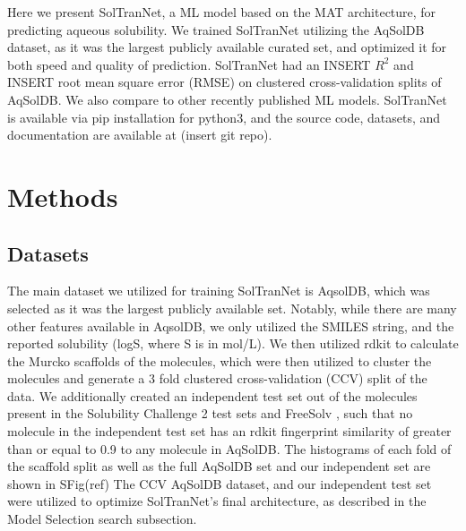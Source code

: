 \documentclass[journal=jmcmar,manuscript=article]{achemso}
\begin{document}
Here we present SolTranNet, a ML model based on the MAT architecture, for predicting aqueous solubility.
We trained SolTranNet utilizing the AqSolDB dataset\cite{AqSol}, as it was the largest publicly available curated set, and optimized it for both speed and quality of prediction.
SolTranNet had an INSERT $R^2$ and INSERT root mean square error (RMSE) on clustered cross-validation splits of AqSolDB.
We also compare to other recently published ML models.\cite{lovric,cui,boobier,llinas}
SolTranNet is available via pip installation for python3, and the source code, datasets, and documentation are available at (insert git repo).


\section{Methods}

\subsection{Datasets}
The main dataset we utilized for training SolTranNet is AqsolDB\cite{AqSol}, which was selected as it was the largest publicly available set.
Notably, while there are many other features available in AqsolDB, we only utilized the SMILES string, and the reported solubility (logS, where S is in mol/L).
We then utilized rdkit\cite{rdkit} to calculate the Murcko scaffolds of the molecules, which were then utilized to cluster the molecules and generate a 3 fold clustered cross-validation (CCV) split of the data.
We additionally created an independent test set out of the molecules present in the Solubility Challenge 2 test sets \cite{llinas} and FreeSolv \cite{freesolv}, such that no molecule in the independent test set has an rdkit fingerprint similarity of greater than or equal to 0.9 to any molecule in AqSolDB.
The histograms of each fold of the scaffold split as well as the full AqSolDB set and our independent set are shown in SFig(ref)
The CCV AqSolDB dataset, and our independent test set were utilized to optimize SolTranNet's final architecture, as described in the Model Selection search subsection.
\end{document}
